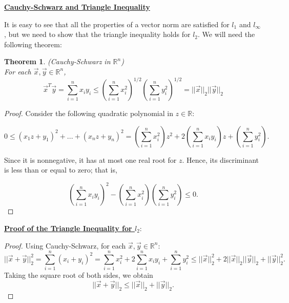 \documentclass[12pt]{article}
\newcommand{\vecx}{\ensuremath{\vec{x}}}
\newcommand{\vecy}{\ensuremath{\vec{y}}}
\newtheorem{theorem}{Theorem}
\begin{document}
\vspace*{1em}
\underline{\textbf{Cauchy-Schwarz and Triangle Inequality}}

It is easy to see that all the properties of a vector norm are satisfied for
$l_1$ and $l_\infty$, but we need to show that the triangle inequality holds 
for $l_2$. We will need the following theorem:

\vspace*{1em}

\begin{theorem}
(Cauchy-Schwarz in $\mathbb{R}^n$)\\
For each $\vecx,\vecy \in \mathbb{R}^n$,
\[
\vecx^T\vecy =
\sum_{i=1}^n x_iy_i\leq\left(\sum_{i=1}^nx_i^2\right)^{1/2}
\left(\sum_{i=1}^ny_i^2\right)^{1/2} = ||\vecx||_2||\vecy||_2
\]
\end{theorem}
\begin{proof}
Consider the following quadratic polynomial in $z\in\mathbb{R}$:

\[
0\leq(x_1z+y_1)^2+...+(x_nz+y_n)^2 = \left(\sum_{i=1}^nx_i^2\right)z^2 +
2\left(\sum_{i=1}^nx_iy_i\right)z + \left(\sum_{i=1}^ny_i^2\right).
\]

Since it is nonnegative, it has at most one real root for $z$.
Hence, its discriminant is less than or equal to zero; that is,

\[
\left(\sum_{i=1}^nx_iy_i\right)^2-
\left(\sum_{i=1}^nx_i^2\right)\left(\sum_{i=1}^ny_i^2\right)\leq 0.
\]
\end{proof}

\vspace*{1em}
\underline{\textbf{Proof of the Triangle Inequality for $l_2$}}:
\begin{proof}
Using Cauchy-Schwarz, for each $\vecx,\vecy \in \mathbb{R}^n$:
\[
||\vecx + \vecy||_2^2 = \sum_{i=1}^n(x_i+y_i)^2 = \sum_{i=1}^nx_i^2 +
2\sum_{i=1}^nx_iy_i + \sum_{i=1}^ny_i^2 \leq ||\vecx||_2^2 +
2||\vecx||_2||\vecy||_2 + ||\vecy||_2^2.
\]
Taking the square root of both sides, we obtain
\[
||\vecx + \vecy||_2 \leq ||\vecx||_2+||\vecy||_2.
\]
\end{proof}
\end{document}

